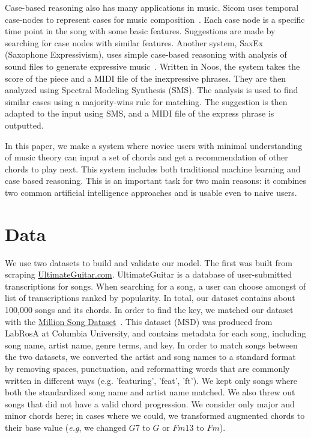 \documentclass[letterpaper]{article}
\begin{document}
Case-based reasoning also has many applications in music. Sicom uses temporal case-nodes to represent cases for music composition~\cite{pereira1997composing}. Each case node is a specific time point in the song with some basic features. Suggestions are made by searching for case nodes with similar features. Another system, SaxEx (Saxophone Expressivism), uses simple case-based reasoning with analysis of sound files to generate expressive music~\cite{arcos1998saxex,arcos2001interactive,de2012playing}. Written in Noos, the system takes the score of the piece and a MIDI file of the inexpressive phrases. They are then analyzed using Spectral Modeling Synthesis (SMS). The analysis is used to find similar cases using a majority-wins rule for matching. The suggestion is then adapted to the input using SMS, and a MIDI file of the express phrase is outputted. 

In this paper, we make a system where novice users with minimal understanding of music theory can input a set of chords and get a recommendation of other chords to play next. This system includes both traditional machine learning and case based reasoning. This is an important task for two main reasons: it combines two common artificial intelligence approaches and is usable even to naive users.

\section{Data}
We use two datasets to build and validate our model. The first was built from scraping \href{https://www.ultimate-guitar.com/}{UltimateGuitar.com}. UltimateGuitar is a database of user-submitted transcriptions for songs. When searching for a song, a user can choose amongst of list of transcriptions ranked by popularity. In total, our dataset contains about 100,000 songs and its chords. In order to find the key, we matched our dataset with the \href{https://labrosa.ee.columbia.edu/millionsong/}{ Million Song Dataset}~\cite{bertin2011million}. This dataset (MSD) was produced from LabRosA at Columbia University, and contains metadata for each song, including song name, artist name, genre terms, and key.  In order to match songs between the two datasets, we converted the artist and song names to a standard format by removing spaces, punctuation, and reformatting words that are commonly written in different ways (e.g. 'featuring', 'feat', 'ft').  We kept only songs where both the standardized song name and artist name matched.  We  also threw out songs that did not have a valid chord progression.  We consider only major and minor chords here; in cases where we could, we transformed augmented chords to their base value (\textit{e.g}, we changed $G7$ to $G$ or $Fm13$ to $Fm$).
\end{document}
